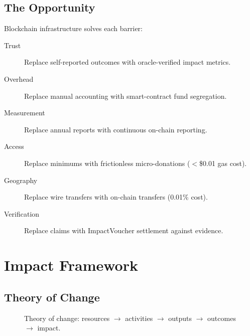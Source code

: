 \documentclass[11pt,letterpaper]{article}
\begin{document}
\subsection{The Opportunity}

Blockchain infrastructure solves each barrier:

\begin{description}
    \item[Trust] Replace self-reported outcomes with oracle-verified impact metrics.
    \item[Overhead] Replace manual accounting with smart-contract fund segregation.
    \item[Measurement] Replace annual reports with continuous on-chain reporting.
    \item[Access] Replace minimums with frictionless micro-donations ($<$\$0.01 gas cost).
    \item[Geography] Replace wire transfers with on-chain transfers (0.01\% cost).
    \item[Verification] Replace claims with ImpactVoucher settlement against evidence.
\end{description}

\section{Impact Framework}
\label{sec:framework}

\subsection{Theory of Change}

\begin{figure}[t]
\centering
{}
\caption{Theory of change: resources $\to$ activities $\to$ outputs $\to$ outcomes $\to$ impact.}
\label{fig:toc}
\end{figure}
\end{document}
